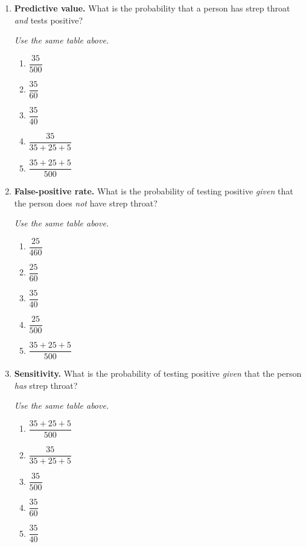 \documentclass{article}
\begin{document}
\begin{enumerate}[label=\textbf{S\arabic*.}]

\item \textbf{Predictive value.} What is the probability that a person has strep
throat \emph{and} tests positive? 

\textit{Use the same table above.}

\begin{enumerate}
  \item $\dfrac{35}{500}$
  \item $\dfrac{35}{60}$
  \item $\dfrac{35}{40}$
  \item $\dfrac{35}{35+25+5}$
  \item $\dfrac{35+25+5}{500}$
\end{enumerate}

\item \textbf{False-positive rate.} What is the probability of testing positive
\emph{given} that the person does \emph{not} have strep throat? 

\textit{Use the same table above.}

\begin{enumerate}
  \item $\dfrac{25}{460}$
  \item $\dfrac{25}{60}$
  \item $\dfrac{35}{40}$
  \item $\dfrac{25}{500}$
  \item $\dfrac{35+25+5}{500}$
\end{enumerate}

\item \textbf{Sensitivity.} What is the probability of testing positive
\emph{given} that the person \emph{has} strep throat? 

\textit{Use the same table above.}

\begin{enumerate}
  \item $\dfrac{35+25+5}{500}$
  \item $\dfrac{35}{35+25+5}$
  \item $\dfrac{35}{500}$
  \item $\dfrac{35}{60}$
  \item $\dfrac{35}{40}$
\end{enumerate}


\end{enumerate}
\end{document}
